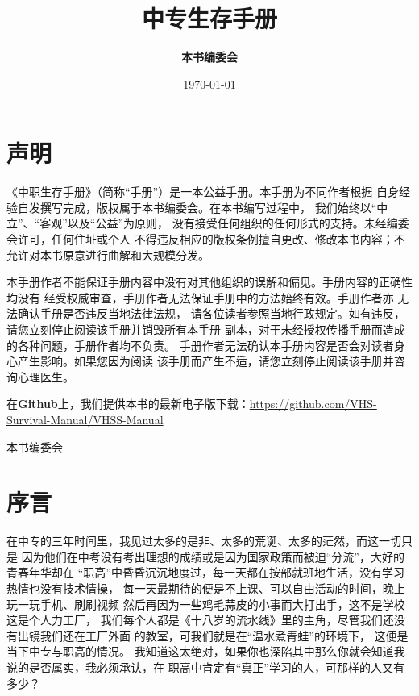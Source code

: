 \documentclass{article}
\begin{document}
\title{\textbf{中专生存手册}}
\author{\textbf{本书编委会}}
\date{\today{}}

\maketitle
\thispagestyle{empty}
\newpage

\section{声明}

《中职生存手册》（简称“手册”）是一本公益手册。本手册为不同作者根据
自身经验自发撰写完成，版权属于本书编委会。在本书编写过程中，
我们始终以“中立”、“客观”以及“公益”为原则，
没有接受任何组织的任何形式的支持。未经编委会许可，任何住址或个人
不得违反相应的版权条例擅自更改、修改本书内容；不允许对本书原意进行曲解和大规模分发。

本手册作者不能保证手册内容中没有对其他组织的误解和偏见。手册内容的正确性均没有
经受权威审查，手册作者无法保证手册中的方法始终有效。手册作者亦
无法确认手册是否违反当地法律法规，
请各位读者参照当地行政规定。如有违反，请您立刻停止阅读该手册并销毁所有本手册
副本，对于未经授权传播手册而造成的各种问题，手册作者均不负责。
手册作者无法确认本手册内容是否会对读者身心产生影响。如果您因为阅读
该手册而产生不适，请您立刻停止阅读该手册并咨询心理医生。

在\textbf{Github}上，我们提供本书的最新电子版下载：\href{VHSS-Manual}{https://github.com/VHS-Survival-Manual/VHSS-Manual}

\begin{flushright}
本书编委会
\end{flushright}
\newpage

\section{序言}

在中专的三年时间里，我见过太多的是非、太多的荒诞、太多的茫然，而这一切只是
因为他们在中考没有考出理想的成绩或是因为国家政策而被迫“分流”，大好的青春年华却在
“职高”中昏昏沉沉地度过，每一天都在按部就班地生活，没有学习热情也没有技术情操，
每一天最期待的便是不上课、可以自由活动的时间，晚上玩一玩手机、刷刷视频
然后再因为一些鸡毛蒜皮的小事而大打出手，这不是学校这是个人力工厂，
我们每个人都是《十八岁的流水线》里的主角，尽管我们还没有出镜我们还在工厂外面
的教室，可我们就是在“温水煮青蛙”的环境下，
这便是当下中专与职高的情况。
我知道这太绝对，如果你也深陷其中那么你就会知道我说的是否属实，我必须承认，在
职高中肯定有“真正”学习的人，可那样的人又有多少？
\end{document}
